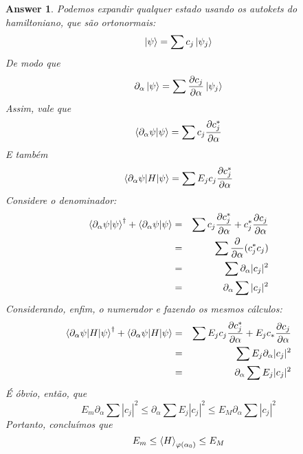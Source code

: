 \documentclass[12pt]{article}
\def\be{\begin{equation}}
\def\ee{\end{equation}}
\def\bea{\begin{eqnarray*}}
\def\eea{\end{eqnarray*}}
\def\f{\frac}
\newtheorem{answer}{Answer}
\begin{document}
\begin{answer}
		Podemos expandir qualquer estado usando os autokets do hamiltoniano, que são ortonormais:
		\be
			\ket{\psi} = \sum c_j\ket{\psi_j}
		\ee
		De modo que
		\be
			\partial_\alpha\ket{\psi} = \sum \f{\partial c_j}{\partial\alpha} \ket{\psi_j}
		\ee
		Assim, vale que
		\be
			\braket{\partial_\alpha\psi|\psi} = \sum c_j\f{\partial c_j^*}{\partial\alpha}
		\ee
		E também
		\be
			\braket{\partial_\alpha\psi|H|\psi} = \sum E_jc_j\f{\partial c_j^*}{\partial\alpha}
		\ee
		Considere o denominador:
		\bea
			\braket{\partial_\alpha\psi|\psi}^\dagger + \braket{\partial_\alpha\psi|\psi} 
				&=& \sum c_j \f{\partial c_j^*}{\partial\alpha} + c_j^*\f{\partial c_j}{\partial\alpha} \\
				&=& \sum \f{\partial}{\partial\alpha} (c_j^*c_j) \\
				&=& \sum \partial_\alpha |c_j|^2 \\
				&=& \partial_\alpha \sum |c_j|^2
		\eea
		Considerando, enfim, o numerador e fazendo os mesmos cálculos:
		\bea
			\braket{\partial_\alpha\psi|H|\psi}^\dagger + \braket{\partial_\alpha\psi|H|\psi} 
				&=& \sum E_jc_j\f{\partial c_j^*}{\partial\alpha} + E_j c_* \f{\partial c_j}{\partial\alpha} \\
				&=& \sum E_j \partial_\alpha |c_j|^2 \\
				&=& \partial_\alpha \sum E_j|c_j|^2 
		\eea
		É óbvio, então, que
		\be
			E_m \partial_\alpha\sum |c_j|^2 \leq \partial_\alpha\sum E_j|c_j|^2 \leq E_M \partial_\alpha\sum |c_j|^2
		\ee 
		Portanto, concluímos que
		\be
			E_m \leq \braket{H}_{\varphi(\alpha_0)} \leq E_M
		\ee
		
		
	\end{answer}
\end{document}
